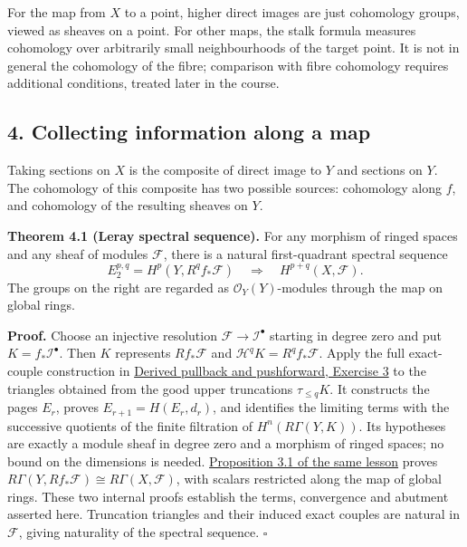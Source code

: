 \documentclass[11pt]{article}
\begin{document}
For the map from \(X\) to a point, higher direct images are just
cohomology groups, viewed as sheaves on a point. For other maps, the
stalk formula measures cohomology over arbitrarily small neighbourhoods
of the target point. It is not in general the cohomology of the fibre;
comparison with fibre cohomology requires additional conditions, treated
later in the course.

\subsection{4. Collecting information along a
map}\label{collecting-information-along-a-map}

Taking sections on \(X\) is the composite of direct image to \(Y\) and
sections on \(Y\). The cohomology of this composite has two possible
sources: cohomology along \(f\), and cohomology of the resulting sheaves
on \(Y\).

\textbf{Theorem 4.1 (Leray spectral sequence).} For any morphism of
ringed spaces and any sheaf of modules \(\mathcal F\), there is a
natural first-quadrant spectral sequence \[
E_2^{p,q}=H^p(Y,R^qf_*\mathcal F)
\quad\Longrightarrow\quad H^{p+q}(X,\mathcal F).
\] The groups on the right are regarded as \(\mathcal O_Y(Y)\)-modules
through the map on global rings.

\textbf{Proof.} Choose an injective resolution
\(\mathcal F\to\mathcal I^\bullet\) starting in degree zero and put
\(K=f_*\mathcal I^\bullet\). Then \(K\) represents \(Rf_*\mathcal F\)
and \(\mathcal H^qK=R^qf_*\mathcal F\). Apply the full exact-couple
construction in
\href{https://kokunoyumeto.github.io/open-math-courses/courses/derived-categories-and-sheaf-operations/derived-pullback-and-pushforward.html\#6-exercises-with-checked-solutions}{Derived
pullback and pushforward, Exercise 3} to the triangles obtained from the
good upper truncations \(\tau_{\le q}K\). It constructs the pages
\(E_r\), proves \(E_{r+1}=H(E_r,d_r)\), and identifies the limiting
terms with the successive quotients of the finite filtration of
\(H^n(R\Gamma(Y,K))\). Its hypotheses are exactly a module sheaf in
degree zero and a morphism of ringed spaces; no bound on the dimensions
is needed.
\href{https://kokunoyumeto.github.io/open-math-courses/courses/derived-categories-and-sheaf-operations/derived-pullback-and-pushforward.html\#3-composition-leray-and-the-local-descriptions}{Proposition
3.1 of the same lesson} proves
\(R\Gamma(Y,Rf_*\mathcal F)\cong R\Gamma(X,\mathcal F)\), with scalars
restricted along the map of global rings. These two internal proofs
establish the terms, convergence and abutment asserted here. Truncation
triangles and their induced exact couples are natural in \(\mathcal F\),
giving naturality of the spectral sequence. \(\square\)
\end{document}
